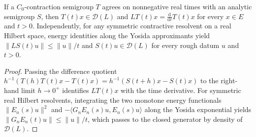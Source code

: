 \begin{proposition}\label{prop:analytic_domain}
\leanok
If a $C_0$-contraction semigroup $T$ agrees on nonnegative real times with an analytic semigroup $S$, then $T(t)x \in \mathcal{D}(L)$ and $L T(t)x = \frac{\mathrm{d}}{\mathrm{d}t} T(t)x$ for every $x \in E$ and $t > 0$. Independently, for any symmetric contractive resolvent on a real Hilbert space, energy identities along the Yosida approximants yield $\lVert L S(t)u \rVert \le \lVert u \rVert / t$ and $S(t)u \in \mathcal{D}(L)$ for every rough datum $u$ and $t > 0$.
\end{proposition}

\begin{proof}
\leanok
Passing the difference quotient $h^{-1}(T(h)T(t)x - T(t)x) = h^{-1}(S(t+h)x - S(t)x)$ to the right-hand limit $h \to 0^+$ identifies $L T(t)x$ with the time derivative. For symmetric real Hilbert resolvents, integrating the two monotone energy functionals $\lVert E_n(s)u \rVert^2$ and $-\langle G_n E_n(s)u, E_n(s)u \rangle$ along the Yosida exponential yields $\lVert G_n E_n(t)u \rVert \le \lVert u \rVert / t$, which passes to the closed generator by density of $\mathcal{D}(L)$.
\end{proof}
